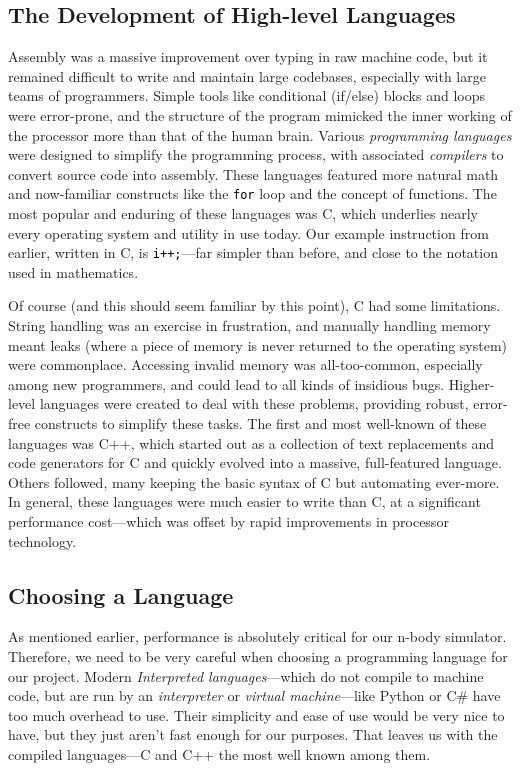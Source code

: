 \documentclass[12pt,twoside]{reedthesis}
\newcommand\code[1]{\colorbox{light-gray}{\texttt{\textcolor{black}{#1}}}}
\begin{document}
\subsection{The Development of High-level Languages}

Assembly was a massive improvement over typing in raw machine code, but it remained difficult to write and maintain large codebases, especially with large teams of programmers. Simple tools like conditional (if/else) blocks and loops were error-prone, and the structure of the program mimicked the inner working of the processor more than that of the human brain. Various \emph{programming languages} were designed to simplify the programming process, with associated \emph{compilers} to convert source code into assembly. These languages featured more natural math and now-familiar constructs like the \code{for} loop and the concept of functions. The most popular and enduring of these languages was C, which underlies nearly every operating system and utility in use today. Our example instruction from earlier, written in C, is \code{i++;}---far simpler than before, and close to the notation used in mathematics.

Of course (and this should seem familiar by this point), C had some limitations. String handling was an exercise in frustration, and manually handling memory meant leaks (where a piece of memory is never returned to the operating system) were commonplace. Accessing invalid memory was all-too-common, especially among new programmers, and could lead to all kinds of insidious bugs. Higher-level languages were created to deal with these problems, providing robust, error-free constructs to simplify these tasks. The first and most well-known of these languages was C++, which started out as a collection of text replacements and code generators for C and quickly evolved into a massive, full-featured language. Others followed, many keeping the basic syntax of C but automating ever-more. In general, these languages were much easier to write than C, at a significant performance cost---which was offset by rapid improvements in processor technology.

\subsection{Choosing a Language}
As mentioned earlier, performance is absolutely critical for our n-body simulator. Therefore, we need to be very careful when choosing a programming language for our project. Modern \emph{Interpreted languages}---which do not compile to machine code, but are run by an \emph{interpreter} or \emph{virtual machine}---like Python or C\# have too much overhead to use. Their simplicity and ease of use would be very nice to have, but they just aren't fast enough for our purposes. That leaves us with the compiled languages---C and C++ the most well known among them.
\end{document}
